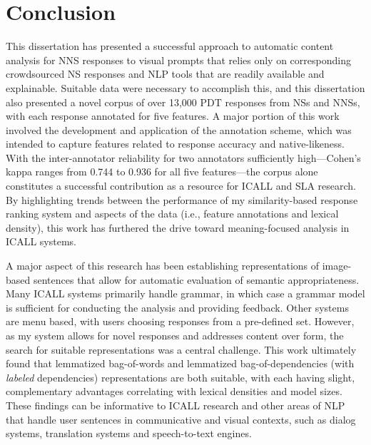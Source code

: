 \chapter{Conclusion}
\label{chap:conclusion}
This dissertation has presented a successful approach to automatic content analysis for NNS responses to visual prompts that relies only on corresponding crowdsourced NS responses and NLP tools that are readily available and explainable. Suitable data were necessary to accomplish this, and this dissertation also presented a novel corpus of over 13,000 PDT responses from NSs and NNSs, with each response annotated for five features. A major portion of this work involved the development and application of the annotation scheme, which was intended to capture features related to response accuracy and native-likeness. With the inter-annotator reliability for two annotators sufficiently high---Cohen's kappa ranges from 0.744 to 0.936 for all five features---the corpus alone constitutes a successful contribution as a resource for ICALL and SLA research. By highlighting trends between the performance of my similarity-based response ranking system and aspects of the data (i.e., feature annotations and lexical density), this work has furthered the drive toward meaning-focused analysis in ICALL systems.



A major aspect of this research has been establishing representations of image-based sentences that allow for automatic evaluation of semantic appropriateness. Many ICALL systems primarily handle grammar, in which case a grammar model is sufficient for conducting the analysis and providing feedback. Other systems are menu based, with users choosing responses from a pre-defined set. However, as my system allows for novel responses and addresses content over form, the search for suitable representations was a central challenge. This work ultimately found that lemmatized bag-of-words and lemmatized bag-of-dependencies (with \textit{labeled} dependencies) representations are both suitable, with each having slight, complementary advantages correlating with lexical densities and model sizes. These findings can be informative to ICALL research and other areas of NLP that handle user sentences in communicative and visual contexts, such as dialog systems, translation systems and speech-to-text engines. 

